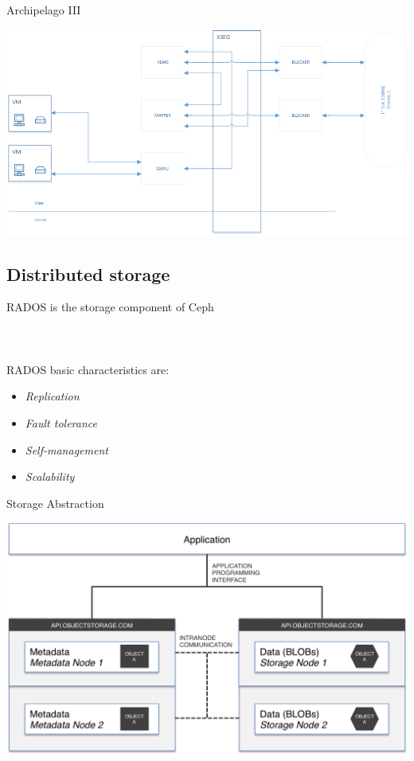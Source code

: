 \begin{frame}{Archipelago III}
\begin{center}
    \includegraphics[scale=0.4]{images/archip-comm.png} \\
\end{center}
\end{frame}

\subsection{Distributed storage}

\begin{frame}{RADOS}
is the storage component of Ceph 
\hfill \\
\hfill \\
\hfill \\
\hfill \\

RADOS basic characteristics are:
\begin{itemize}
\item \textit{Replication}
\item \textit{Fault tolerance}
\item \textit{Self-management}
\item \textit{Scalability}\end{itemize}
\end{frame}


\begin{frame}{Storage Abstraction}
\begin{center}
    \includegraphics[scale=0.4]{images/object_storage_arch.png} \\
\end{center}
\end{frame}

